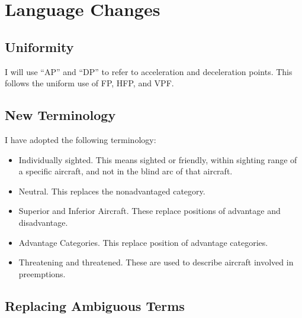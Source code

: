 \documentclass[10pt]{article}
\begin{document}
\section{Language Changes}

%

\subsection{Uniformity}

I will use “AP” and “DP” to refer to acceleration and deceleration points. This follows the uniform use of FP, HFP, and VPF.

\subsection{New Terminology}

I have adopted the following terminology:

\begin{itemize}
    \item Individually sighted. This means sighted or friendly, within sighting range of a specific aircraft, and not in the blind arc of that aircraft.
    \item Neutral. This replaces the nonadvantaged category.
    \item Superior and Inferior Aircraft. These replace positions of advantage and disadvantage.
    \item Advantage Categories. This replace position of advantage categories.
    \item Threatening and threatened. These are used to describe aircraft involved in preemptions.
\end{itemize}



\subsection{Replacing Ambiguous Terms}
\end{document}
